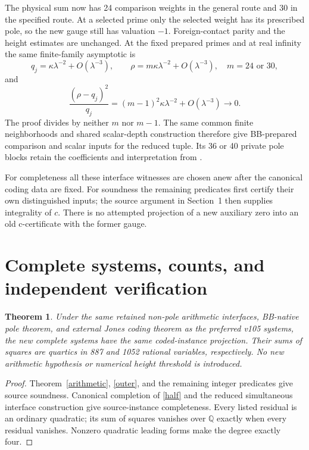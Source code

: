 \documentclass[11pt]{article}
\newtheorem{theorem}{Theorem}
\newcommand{\Q}{\mathbb Q}\newcommand{\Z}{\mathbb Z}
\begin{document}
The physical sum now has 24 comparison weights in the general
route and 30 in the specified route. At a selected prime only
the selected weight has its prescribed pole, so the new gauge
still has valuation $-1$. Foreign-contact parity and the height
estimates are unchanged. At the fixed prepared primes and at
real infinity the same finite-family asymptotic is
\[
 q_j=\kappa\lambda^{-2}+O(\lambda^{-3}),\qquad
 \rho=m\kappa\lambda^{-2}+O(\lambda^{-3}),\quad m=24\text{ or }30,
\]
and
\[
 \frac{(\rho-q_j)^2}{q_j}
       =(m-1)^2\kappa\lambda^{-2}+O(\lambda^{-3})\longrightarrow0.
\]
The proof divides by neither $m$ nor $m-1$. The same common
finite neighborhoods and shared scalar-depth construction therefore
give BB-prepared comparison and scalar inputs for the reduced
tuple. Its 36 or 40 private pole blocks retain the coefficients
and interpretation from \cite{bb}.

For completeness all these interface witnesses are chosen anew
after the canonical coding data are fixed. For soundness the
remaining predicates first certify their own distinguished inputs;
the source argument in Section~1 then supplies integrality of $c$.
There is no attempted projection of a new auxiliary zero into an
old c-certificate with the former gauge.

\section{Complete systems, counts, and independent verification}

\begin{theorem}\label{main}
Under the same retained non-pole arithmetic interfaces, BB-native
pole theorem, and external Jones coding theorem as the preferred
v105 systems, the new complete systems have the same coded-instance
projection. Their sums of squares are quartics in 887 and 1052
rational variables, respectively. No new arithmetic hypothesis or
numerical height threshold is introduced.
\end{theorem}
\begin{proof}
Theorem~\ref{arithmetic}, \eqref{outer}, and the remaining
integer predicates give source soundness. Canonical completion
of \eqref{half} and the reduced simultaneous interface construction
give source-instance completeness. Every listed residual is an
ordinary quadratic; its sum of squares vanishes over $\Q$ exactly
when every residual vanishes. Nonzero quadratic leading forms
make the degree exactly four.
\end{proof}
\end{document}
